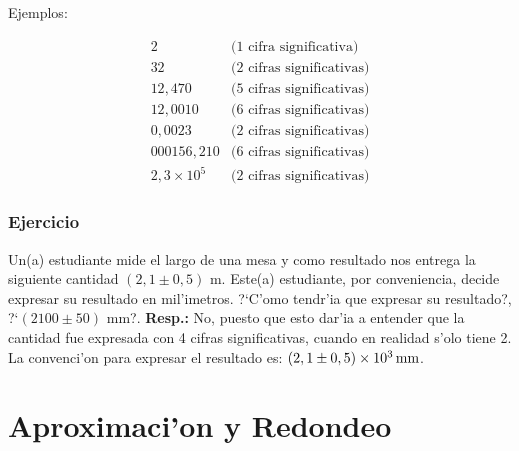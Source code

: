Ejemplos:

\begin{equation}
\begin{array}{ll}
2 & (1 \text{ cifra significativa)}\\
32 & (2 \text{ cifras significativas)}\\
12,470 & (5 \text{ cifras significativas)}\\
12,0010 &(6 \text{ cifras significativas)}\\
0,0023 & (2 \text{ cifras significativas)}\\
000156,210 & (6 \text{ cifras significativas)}\\
2,3\times 10^5 &(2 \text{ cifras significativas)}
\end{array}
\end{equation}


\subsubsection{Ejercicio}

Un(a) estudiante mide el largo de una mesa y como resultado nos entrega
la siguiente cantidad $(2,1\pm 0,5)$ m. Este(a) estudiante, por
conveniencia, decide expresar su resultado en mil'imetros. ?`C'omo tendr'ia
que expresar su resultado?, ?`$(2100\pm 50)$ mm?. \textbf{Resp.:} No, puesto que esto dar'ia a entender que la cantidad fue expresada con 4 cifras significativas, cuando en realidad s'olo tiene 2. La convenci'on para expresar el resultado es: $(2,1\pm 0,5)\times 10^3\,\rm mm$.

\section{Aproximaci'on y Redondeo}

